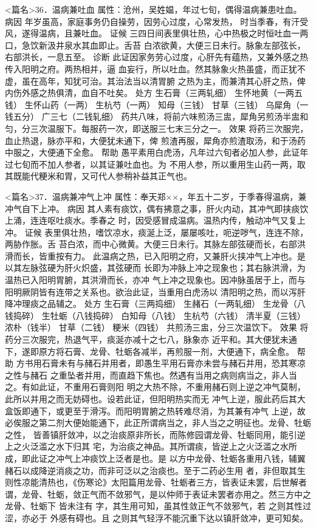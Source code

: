 \documentclass[a4paper,12pt,UTF8,twoside]{ctexbook}
\begin{document}
<篇名>36．温病兼吐血
属性：沧州，吴姓媪，年过七旬，偶得温病兼患吐血。 
病因 年岁虽高，家庭事务仍自操劳，因劳心过度，心常发热， 
时当季春，有汗受风，遂得温病，且兼吐血。 
证候 三四日间表里俱壮热，心中热极之时恒吐血一两口，急饮新汲井泉水其血即止。舌苔 
白浓欲黄，大便三日未行。脉象左部弦长，右部洪长，一息五至。 
诊断 此证因家务劳心过度，心肝先有蕴热，又兼外感之热传入阳明之府。两热相并，逼 
血妄行，所以吐血。然其脉象火热虽盛，而正犹不虚，虽在高年，知犹可治。其治法当以清胃腑 
之热为主，而兼清其心肝之热，俾内伤外感之热俱清，血自不吐矣。 
处方 生石膏（三两轧细） 生怀地黄（一两五钱） 生怀山药（一两） 生杭芍（一两） 
知母（三钱） 甘草（三钱） 乌犀角（一钱五分） 广三七（二钱轧细） 
药共八味，将前六味煎汤三盅，犀角另煎汤半盅和匀，分三次温服下。每服药一次，即送服三七末三分之一。 
效果 将药三次服完，血止热退，脉亦平和，大便犹未通下，俾 
煎渣再服，犀角亦煎渣取汤，和于汤药中服之，大便通下全愈。 
帮助 愚平素用白虎汤，凡年过六旬者必加人参，此证年过七旬而不加人参者，以其证兼吐血也。为 
不用人参，所以重用生山药一两，取其既能代粳米和胃，又可代人参稍补益其正气也。 


<篇名>37．温病兼冲气上冲
属性：奉天郑××，年五十二岁，于季春得温病，兼冲气自下上冲。 
病因 其人素有痰饮，偶有拂意之事，肝火内动，其冲气即挟痰饮上涌，连连呕吐痰水。季春之 
时，因受感冒成温病。温热内传，触动冲气又复上冲。 
证候 表里俱壮热，嗜饮凉水，痰涎上泛，屡屡咳吐，呃逆哕气，连连不除，两胁作胀。舌 
苔白浓，而中心微黄。大便三日未行。其脉左部弦硬而长，右部洪滑而长，皆重按有力。 
此温病之热，已入阳明之府，又兼肝火挟冲气上冲也。是以其左脉弦硬为肝火炽盛，其弦硬而 
长即为冲脉上冲之现象也；其右脉洪滑，为温热已入阳明胃腑，其洪滑而长，亦冲 
气上冲之现象也。因冲脉虽居于上，而与阳明厥阴皆有连带之关系也。欲治此证，当重用白虎汤以 
清阳明之热，而以泻肝降冲理痰之品辅之。 
处方 生石膏（三两捣细） 生赭石（一两轧细） 生龙骨（八钱捣碎） 生牡蛎（八钱捣碎） 
白知母（八钱） 生杭芍（六钱） 清半夏（三钱） 浓朴（钱半） 
甘草（二钱） 粳米（四钱） 
共煎汤三盅，分三次温饮下。 
效果 将药分三次服完，热退气平，痰涎亦减十之七八，脉象亦 
近平和。其大便犹未通下，遂即原方将石膏、龙骨、牡蛎各减半，再煎服一剂，大便通下，病全愈。 
帮助 方书用石膏未有与赭石并用者，即愚生平用石膏亦未尝与赭石并用，恐其寒凉之性与赭石 
之重坠者并用，而直趋下焦也。然遇有当用之病则病当之，非人当之。有如此证，不重用石膏则阳 
明之大热不除，不重用赭石则上逆之冲气莫制，此所以并用之而无妨碍也。设若此证，但阳明热实而无 
冲气上逆，服此药后其大盒饭即通下，或更至于滑泻。而阳明胃腑之热转难尽消，为其兼有冲气 
上逆，故必俟服之第二剂大便始能通下，此正所谓病当之，非人当之之明征也。龙骨、牡蛎之性， 
皆善镇肝敛冲，以之治痰原非所长，而陈修园谓龙骨、牡蛎同用，能引逆上之火泛滥之水下归其 
宅，为治痰之神品。其所谓痰，皆逆上之火泛滥之水所成，即此证之冲气上冲痰饮上泛者是也。是 
以方中龙骨、牡蛎各重用八钱，辅翼赭石以成降逆消痰之功，而非可泛以之治痰也。至于二药必生用 
者，非但取其生则性凉能清热也，《伤寒论》太阳篇用龙骨、牡蛎者三方，皆表证未罢，后世解者 
谓，龙骨、牡蛎，敛正气而不敛邪气，是以仲师于表证未罢者亦用之。然三方中之龙骨、牡蛎下 
皆未注有 字，其生用可知，虽其性敛正气不敛邪气，若 之则其性过涩，亦必于 
外感有碍也。且 之则其气轻浮不能沉重下达以镇肝敛冲，更可知矣。 
\end{document}
